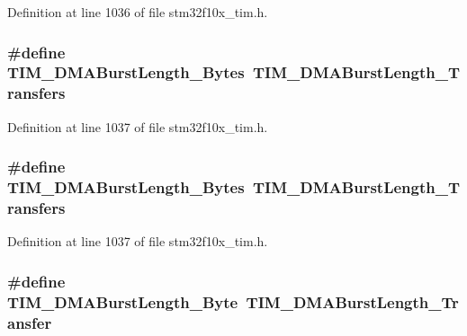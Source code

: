 Definition at line 1036 of file stm32f10x\+\_\+tim.\+h.

\subsubsection[{\texorpdfstring{T\+I\+M\+\_\+\+D\+M\+A\+Burst\+Length\+\_\+18\+Bytes}{TIM_DMABurstLength_18Bytes}}]{\setlength{\rightskip}{0pt plus 5cm}\#define T\+I\+M\+\_\+\+D\+M\+A\+Burst\+Length\+\_\+Bytes~{\bf T\+I\+M\+\_\+\+D\+M\+A\+Burst\+Length\+\_\+Transfers}}\hypertarget{group___t_i_m___legacy_ga9c4d457417b1ba72ed0ae9886a75547a}{}\label{group___t_i_m___legacy_ga9c4d457417b1ba72ed0ae9886a75547a}


Definition at line 1037 of file stm32f10x\+\_\+tim.\+h.

\subsubsection[{\texorpdfstring{T\+I\+M\+\_\+\+D\+M\+A\+Burst\+Length\+\_\+18\+Bytes}{TIM_DMABurstLength_18Bytes}}]{\setlength{\rightskip}{0pt plus 5cm}\#define T\+I\+M\+\_\+\+D\+M\+A\+Burst\+Length\+\_\+Bytes~{\bf T\+I\+M\+\_\+\+D\+M\+A\+Burst\+Length\+\_\+Transfers}}\hypertarget{group___t_i_m___legacy_ga9c4d457417b1ba72ed0ae9886a75547a}{}\label{group___t_i_m___legacy_ga9c4d457417b1ba72ed0ae9886a75547a}


Definition at line 1037 of file stm32f10x\+\_\+tim.\+h.

\subsubsection[{\texorpdfstring{T\+I\+M\+\_\+\+D\+M\+A\+Burst\+Length\+\_\+1\+Byte}{TIM_DMABurstLength_1Byte}}]{\setlength{\rightskip}{0pt plus 5cm}\#define T\+I\+M\+\_\+\+D\+M\+A\+Burst\+Length\+\_\+Byte~{\bf T\+I\+M\+\_\+\+D\+M\+A\+Burst\+Length\+\_\+Transfer}}\hypertarget{group___t_i_m___legacy_gad915c67fae262b887f4f074809448309}{}\label{group___t_i_m___legacy_gad915c67fae262b887f4f074809448309}


